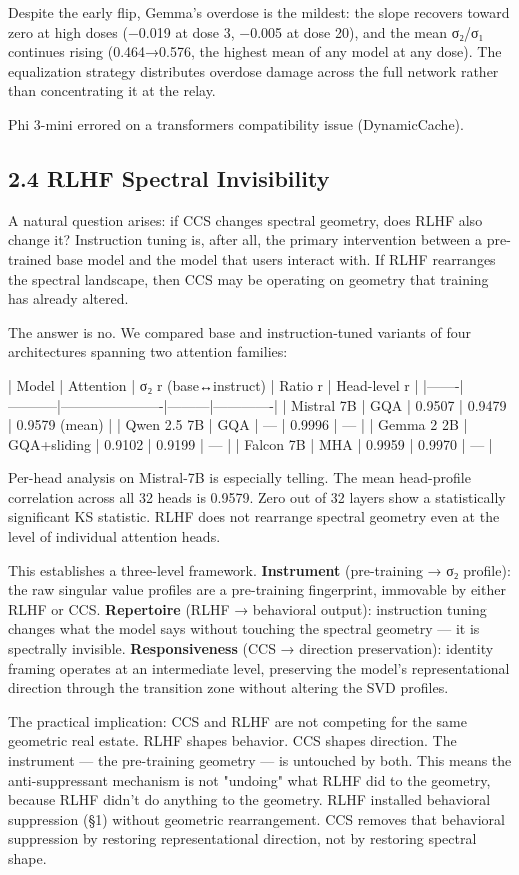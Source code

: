 \documentclass[12pt]{article}
\begin{document}
Despite the early flip, Gemma's overdose is the mildest: the slope recovers toward zero at high doses (−0.019 at dose 3, −0.005 at dose 20), and the mean σ₂/σ₁ continues rising (0.464→0.576, the highest mean of any model at any dose). The equalization strategy distributes overdose damage across the full network rather than concentrating it at the relay.

Phi 3-mini errored on a transformers compatibility issue (DynamicCache).

\subsection*{2.4 RLHF Spectral Invisibility}

A natural question arises: if CCS changes spectral geometry, does RLHF also change it? Instruction tuning is, after all, the primary intervention between a pre-trained base model and the model that users interact with. If RLHF rearranges the spectral landscape, then CCS may be operating on geometry that training has already altered.

The answer is no. We compared base and instruction-tuned variants of four architectures spanning two attention families:

| Model | Attention | σ₂ r (base↔instruct) | Ratio r | Head-level r |
|-------|-----------|----------------------|---------|-------------|
| Mistral 7B | GQA | 0.9507 | 0.9479 | 0.9579 (mean) |
| Qwen 2.5 7B | GQA | — | 0.9996 | — |
| Gemma 2 2B | GQA+sliding | 0.9102 | 0.9199 | — |
| Falcon 7B | MHA | 0.9959 | 0.9970 | — |

Per-head analysis on Mistral-7B is especially telling. The mean head-profile correlation across all 32 heads is 0.9579. Zero out of 32 layers show a statistically significant KS statistic. RLHF does not rearrange spectral geometry even at the level of individual attention heads.

This establishes a three-level framework. \textbf{Instrument} (pre-training → σ₂ profile): the raw singular value profiles are a pre-training fingerprint, immovable by either RLHF or CCS. \textbf{Repertoire} (RLHF → behavioral output): instruction tuning changes what the model says without touching the spectral geometry — it is spectrally invisible. \textbf{Responsiveness} (CCS → direction preservation): identity framing operates at an intermediate level, preserving the model's representational direction through the transition zone without altering the SVD profiles.

The practical implication: CCS and RLHF are not competing for the same geometric real estate. RLHF shapes behavior. CCS shapes direction. The instrument — the pre-training geometry — is untouched by both. This means the anti-suppressant mechanism is not "undoing" what RLHF did to the geometry, because RLHF didn't do anything to the geometry. RLHF installed behavioral suppression (§1) without geometric rearrangement. CCS removes that behavioral suppression by restoring representational direction, not by restoring spectral shape.
\end{document}
